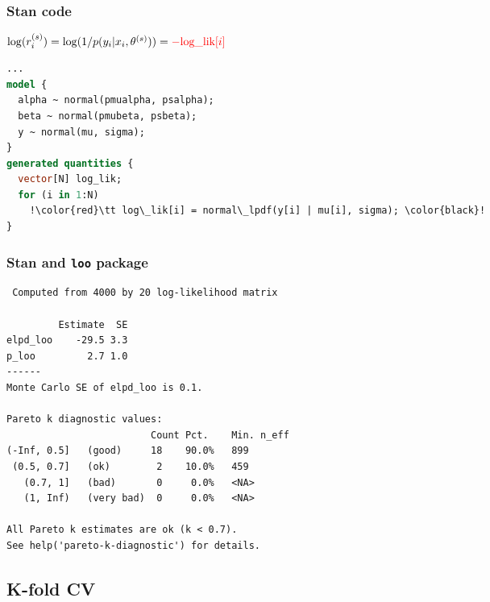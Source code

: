 \documentclass[10pt]{beamer}
\begin{document}
\begin{frame}[fragile]
\frametitle{Stan code}

  \vspace{\baselineskip}
  $ \log(r_i^{(s)}) = \log(1/p(y_i|x_i,\theta^{(s)})) = {\color{red}-\mbox{log\_lik}[i]}$
  \vspace{\baselineskip}

  \pause
  {\small
\begin{lstlisting}[language=Stan,escapechar=!]
...
model {
  alpha ~ normal(pmualpha, psalpha);
  beta ~ normal(pmubeta, psbeta);
  y ~ normal(mu, sigma);
}
generated quantities {
  vector[N] log_lik;
  for (i in 1:N)
    !\color{red}\tt log\_lik[i] = normal\_lpdf(y[i] | mu[i], sigma); \color{black}!
}
\end{lstlisting}
  }

\end{frame}

\begin{frame}[fragile]
\frametitle{Stan and {\tt loo} package}

  {\scriptsize
\begin{lstlisting}
 Computed from 4000 by 20 log-likelihood matrix

         Estimate  SE
elpd_loo    -29.5 3.3
p_loo         2.7 1.0
------
Monte Carlo SE of elpd_loo is 0.1.

Pareto k diagnostic values:
                         Count Pct.    Min. n_eff
(-Inf, 0.5]   (good)     18    90.0%   899
 (0.5, 0.7]   (ok)        2    10.0%   459
   (0.7, 1]   (bad)       0     0.0%   <NA>
   (1, Inf)   (very bad)  0     0.0%   <NA>

All Pareto k estimates are ok (k < 0.7).
See help('pareto-k-diagnostic') for details.
\end{lstlisting}
}

\end{frame}



\subsection{K-fold CV}
\frame{\subsectionpage}
\end{document}
